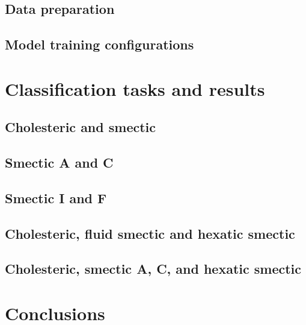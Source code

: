 \documentclass[12pt]{article}
\begin{document}
\subsection{Data preparation}

\subsection{Model training configurations}

\section{Classification tasks and results}

\subsection{Cholesteric and smectic}

\subsection{Smectic A and C}

\subsection{Smectic I and F}

\subsection{Cholesteric, fluid smectic and hexatic smectic}

\subsection{Cholesteric, smectic A, C, and hexatic smectic}

\section{Conclusions}



\appendix
\appendixpage
\end{document}
